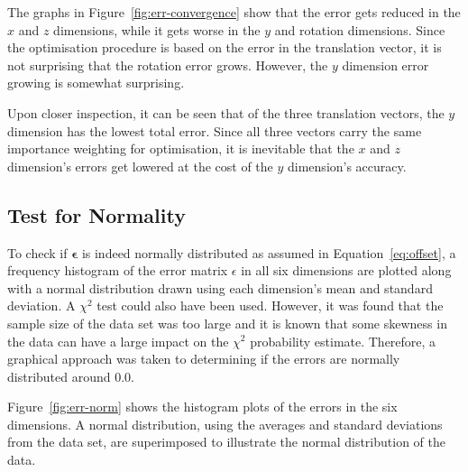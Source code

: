 The graphs in Figure~\ref{fig:err-convergence} show that the error gets reduced in the $x$ and $z$ dimensions, while it gets worse in the $y$ and rotation dimensions. Since the optimisation procedure is based on the error in the translation vector, it is not surprising that the rotation error grows. However, the $y$ dimension error growing is somewhat surprising.  %

Upon closer inspection, it can be seen that of the three translation vectors, the $y$ dimension has the lowest total error. Since all three vectors carry the same importance weighting for optimisation, it is inevitable that the $x$ and $z$ dimension's errors get lowered at the cost of the $y$ dimension's accuracy. 

\subsection{Test for Normality}
\label{sec:err-norm-test}

To check if $\bm{\epsilon}$ is indeed normally distributed as assumed in Equation~\ref{eq:offset}, a frequency histogram of the error matrix $\epsilon$ in all six dimensions are plotted along with a normal distribution drawn using each dimension's mean and standard deviation. A $\chi^2$ test could also have been used. However, it was found that the sample size of the data set was too large and it is known that some skewness in the data can have a large impact on the $\chi^2$ probability estimate. Therefore, a graphical approach was taken to determining if the errors are normally distributed around 0.0. 

Figure~\ref{fig:err-norm} shows the histogram plots of the errors in the six dimensions. A normal distribution, using the averages and standard deviations from the data set, are superimposed to illustrate the normal distribution of the data.

